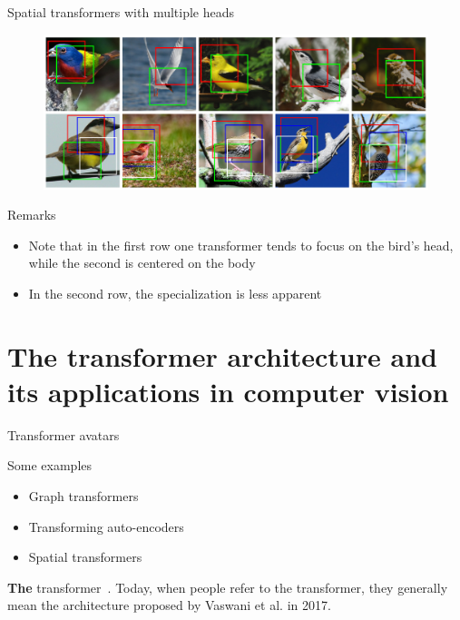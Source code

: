 \documentclass[xcolor=pdftex,dvipsnames,table,mathserif]{beamer}
\begin{document}
\begin{frame}{Spatial transformers with multiple heads}

  \begin{figure}[ht]
    \centering
    \includegraphics[width=\textwidth]{spatial_transformers_birds}
  \end{figure}

\begin{block}{Remarks}
  \begin{itemize}
  \item Note that in the first row one transformer tends to focus on the bird's head, while the second is centered on the body
  \item In the second row, the specialization is less apparent
  \end{itemize}
\end{block}

\end{frame}

\section{The transformer architecture and its applications in computer vision}


\begin{frame}{Transformer avatars}

  \begin{block}{Some examples}
    \begin{itemize}
    \item Graph transformers~\cite{lecun_gradient-based_1998}
    \item Transforming auto-encoders~\cite{hinton_transforming_2011}
    \item Spatial transformers~\cite{jaderberg_spatial_2016}
    \end{itemize}
  \end{block}

  \begin{alertblock}{\textbf{The} transformer~\cite{vaswani_attention_2017}.}
    Today, when people refer to the transformer, they generally mean the architecture proposed by Vaswani et al. in 2017.
  \end{alertblock}

\end{frame}
\end{document}
